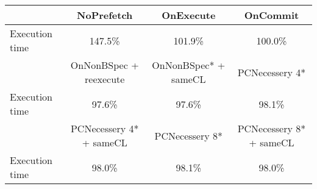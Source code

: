 \begin{tabular}{ l|ccc }
 & NoPrefetch & OnExecute & OnCommit\\ \hline
Execution time & 147.5\% & 101.9\% & 100.0\%\\ \hline
\hline
 & OnNonBSpec + reexecute & OnNonBSpec* + sameCL & PCNecessery 4*\\ \hline
Execution time & 97.6\% & 97.6\% & 98.1\%\\ \hline
\hline
 & PCNecessery 4* + sameCL & PCNecessery 8* & PCNecessery 8* + sameCL\\ \hline
Execution time & 98.0\% & 98.1\% & 98.0\%\\ \hline
\end{tabular}

